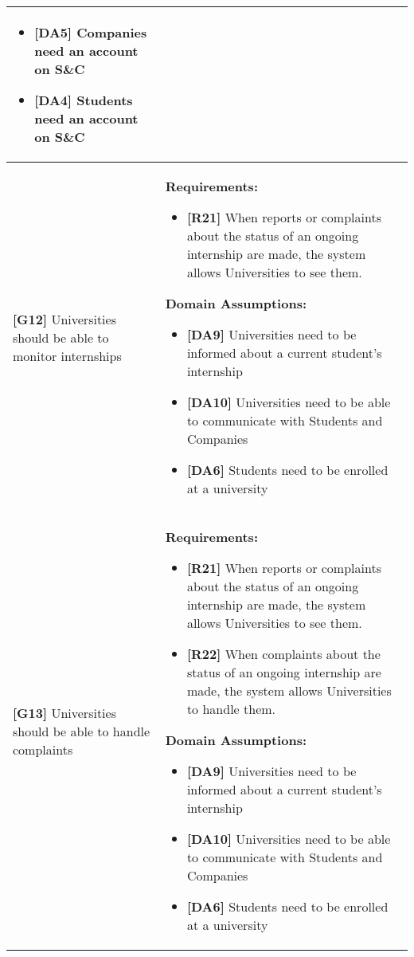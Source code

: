 \begin{longtable}{|p{}|p{}|}
\begin{itemize}
    \item \textbf{[DA5]} Companies need an account on S\&C
    \item \textbf{[DA4]} Students need an account on S\&C
\end{itemize} \\
\hline
\textbf{[G12]} Universities should be able to monitor internships
& 
\textbf{Requirements:}
\begin{itemize}



    \item \textbf{[R21]} When reports or complaints about the status of an ongoing internship are made, the system allows Universities to see them.
\end{itemize}
\textbf{Domain Assumptions:}
\begin{itemize}
    \item \textbf{[DA9]} Universities need to be informed about a current student’s internship
    \item \textbf{[DA10]} Universities need to be able to communicate with Students and Companies
    \item \textbf{[DA6]} Students need to be enrolled at a university
\end{itemize} \\
\hline
\textbf{[G13]} Universities should be able to handle complaints
& 
\textbf{Requirements:}
\begin{itemize}
    \item \textbf{[R21]} When reports or complaints about the status of an ongoing internship are made, the system allows Universities to see them.
    \item \textbf{[R22]} When complaints about the status of an ongoing internship are made, the system allows Universities to handle them.
\end{itemize}
\textbf{Domain Assumptions:}
\begin{itemize}
    \item \textbf{[DA9]} Universities need to be informed about a current student’s internship
    \item \textbf{[DA10]} Universities need to be able to communicate with Students and Companies
    \item \textbf{[DA6]} Students need to be enrolled at a university

\end{itemize} \\
\hline
\end{longtable}


